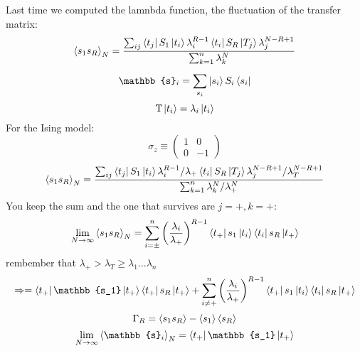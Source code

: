 \documentclass[../main/main.tex]{subfiles}
\begin{document}

Last time we computed the lamnbda function, the fluctuation of the transfer matrix:
\begin{equation}
  \expval{s_1 s_R}_N = \frac{\sum_{ij}^{} \bra{t_j} S_1 \ket{t_i} \lambda _i^{R-1} \bra{t_i}S_R \ket{T_j} \lambda _j^{N-R+1}      }{\sum_{k=1}^{n} \lambda _k^N  }
\end{equation}
\begin{equation}
  \mathbb{s}_i = \sum_{s_i}^{} \ket{s_i}S_i \bra{s_i}
\end{equation}
\begin{equation}
  \mathbb{T} \ket{t_i} = \lambda _i \ket{t_i}
\end{equation}
For the Ising model:
\begin{equation}
  \sigma _z \equiv
  \begin{pmatrix}
    1 & 0 \\
    0  &-1
  \end{pmatrix}
\end{equation}
\begin{equation}
  \expval{s_1 s_R}_N = \frac{\sum_{ij}^{} \bra{t_j} S_1 \ket{t_i} \lambda _i^{R-1} / \lambda _+ \bra{t_i}S_R \ket{T_j} \lambda _j^{N-R+1}  / \lambda _T^{N-R+1}    }{\sum_{k=1}^{n} \lambda _k^N  / \lambda _+^{N} }
\end{equation}
You keep the sum and the one that survives are \( j=+,k=+ \):
\begin{equation}
  \lim_{N \rightarrow \infty } \expval{s_1 s_R}_N = \sum_{i= \pm}^{n} \qty(\frac{\lambda _i}{\lambda _+})^{R-1} \bra{t_+} s_1 \ket{t_i} \bra{t_i} s_R \ket{t_+}
\end{equation}
rembember that \( \lambda _+ > \lambda _T \ge \lambda _1 \dots \lambda _n \)
\begin{equation}
  \Rightarrow = \bra{t_+} \mathbb{s_1} \ket{t_+} \bra{t_+} s_R \ket{t_+} +   \sum_{i \neq +}^{n} \qty(\frac{\lambda _i}{\lambda _+})^{R-1} \bra{t_+} s_1 \ket{t_i} \bra{t_i} s_R \ket{t_+}
\end{equation}
\begin{equation}
  \Gamma _R = \expval{s_1 s_R} - \expval{s_1}\expval{s_R}
\end{equation}
\begin{equation}
  \lim_{N \rightarrow \infty } \expval{\mathbb{s}_i}_N = \bra{t_+} \mathbb{s_1} \ket{t_+}
  \label{eq:8_1}
\end{equation}
\end{document}
